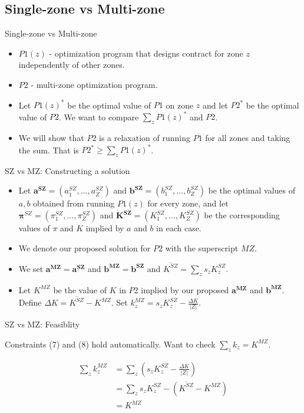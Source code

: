 \documentclass{beamer}
\begin{document}
\subsection{Single-zone vs Multi-zone}
\begin{frame}{Single-zone vs Multi-zone}
  \begin{itemize}
    \setlength\itemsep{2em}
    \item $P1(z)$ - optimization program that designs contract for zone $z$ independently of other zones. 
    \item $P2$ - multi-zone optimization program. 
    \item Let $P1(z)^*$ be the optimal value of $P1$ on zone $z$ and let $P2^*$ be the optimal value of $P2$. We want to compare $\sum_z P1(z)^*$ and $P2$.
    \item We will show that $P2$ is a relaxation of running $P1$ for all zones and taking the sum. That is $P2^* \geq \sum_z P1(z)^*$.
  \end{itemize}
\end{frame}

\begin{frame}{SZ vs MZ: Constructing a solution}
    \begin{itemize}
        \setlength\itemsep{2em}
        \item Let $\mathbf{a^{SZ}} = (a^{SZ}_1,...,a^{SZ}_Z)$ and $\mathbf{b^{SZ}} = (b^{SZ}_1,...,b^{SZ}_Z)$ be the optimal values of $a,b$ obtained from running $P1(z)$ for every zone, and let $ {\pmb \pi^{SZ}} = (\pi^{SZ}_1,...,\pi^{SZ}_Z)$ and $\mathbf{K^{SZ}} = (K^{SZ}_1,...,K^{SZ}_Z)$ be the corresponding values of $\pi$ and $K$ implied by $a$ and $b$ in each case.
        \item We denote our proposed solution for $P2$ with the superscript $MZ$.
        \item We set $\mathbf{a^{MZ}} = \mathbf{a^{SZ}}$ and $\mathbf{b^{MZ}} = \mathbf{b^{SZ}}$ and $\overline{K^{SZ}} = \sum_z s_z K^{SZ}_z$.
        \item Let $K^{MZ}$ be the value of $K$ in $P2$ implied by our proposed $\mathbf{a^{MZ}}$ and $\mathbf{b^{MZ}}$. Define $\Delta K = \overline{K^{SZ}} - K^{MZ}$. Set $k_z^{MZ} = s_z K^{SZ}_z - \frac{\Delta K}{|Z|}$.
    \end{itemize}
    
\end{frame}

\begin{frame}{SZ vs MZ: Feasiblity}
  
   Constraints (7) and (8) hold automatically. Want to check $\sum_z k_z = K^{MZ}$.

    \begin{align*}
    \sum_z k^{MZ}_z &= \sum_z (s_z K^{SZ}_z - \frac{\Delta K}{|Z|} )\\
    &= \sum_z s_z K^{SZ}_z - (\overline{K^{SZ}} - K^{MZ}) \\
    &= K^{MZ}
    \end{align*}

    
\end{frame}
\end{document}
